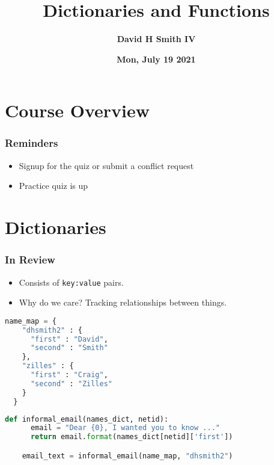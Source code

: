 \documentclass{beamer}
\title{\textbf{Dictionaries and Functions}}
\author{\textbf{David H Smith IV}}
\institute[\textbf{UIUC}]{\textbf{University of Illinois Urbana-Champaign}}
\date{\textbf{Mon, July 19 2021}}
\begin{document}
\frame{\titlepage}

\section{Course Overview}

%
%
\begin{frame}
  \frametitle{Reminders}
  \begin{itemize}
    \item Signup for the quiz or submit a conflict request
    \item Practice quiz is up
  \end{itemize}
\end{frame}

\section{Dictionaries}

%
%
\begin{frame}[fragile]
  \frametitle{In Review} 
  \vfill
  \begin{minipage}{0.60\textwidth}
    \begin{itemize}
      \item Consists of \lstinline|key:value| pairs.
      \item Why do we care? Tracking relationships between things. 
    \end{itemize}
  \end{minipage}
  \begin{minipage}{0.39\textwidth} 
    \begin{lstlisting}[language=Python, autogobble]
  name_map = {
    "dhsmith2" : {
      "first" : "David",
      "second" : "Smith"
    },
    "zilles" : {
      "first" : "Craig",
      "second" : "Zilles"
    }
  }\end{lstlisting}
  \end{minipage}
  \vfill
  \begin{lstlisting}[language=Python, autogobble]
    def informal_email(names_dict, netid):
      email = "Dear {0}, I wanted you to know ..."
      return email.format(names_dict[netid]['first'])

    email_text = informal_email(name_map, "dhsmith2")
  \end{lstlisting}
\end{frame}
\end{document}
